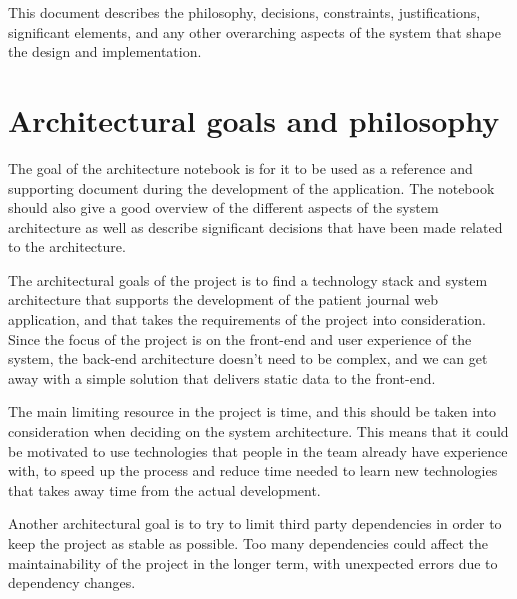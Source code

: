 \documentclass{article}
\begin{document}
This document describes the philosophy, decisions, constraints, justifications, significant elements, and any other overarching aspects of the system that shape the design and implementation. 

\section{Architectural goals and philosophy}
The goal of the architecture notebook is for it to be used as a reference and supporting document during the development of the application. The notebook should also give a good overview of the different aspects of the system architecture as well as describe significant decisions that have been made related to the architecture. 

The architectural goals of the project is to find a technology stack and system architecture that supports the development of the patient journal web application, and that takes the requirements of the project into consideration. Since the focus of the project is on the front-end and user experience of the system, the back-end architecture doesn't need to be complex, and we can get away with a simple solution that delivers static data to the front-end.

The main limiting resource in the project is time, and this should be taken into consideration when deciding on the system architecture. This means that it could be motivated to use technologies that people in the team already have experience with, to speed up the process and reduce time needed to learn new technologies that takes away time from the actual development.

Another architectural goal is to try to limit third party dependencies in order to keep the project as stable as possible. Too many dependencies could affect the maintainability of the project in the longer term, with unexpected errors due to dependency changes.
\end{document}
